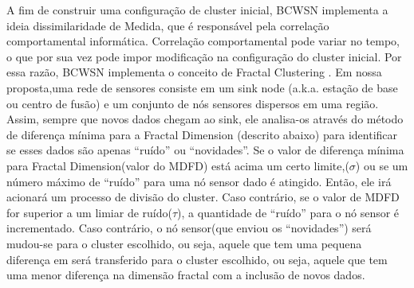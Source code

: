 \documentclass{acm_proc_article-sp}
\begin{document}


A fim de construir uma configuração de cluster inicial, BCWSN implementa
a ideia dissimilaridade de Medida, que é responsável pela correlação
comportamental informática. Correlação comportamental pode variar no tempo,
o que por sua vez pode impor modificação na configuração do cluster inicial.
Por essa razão, BCWSN implementa o conceito de Fractal Clustering
\cite{Barbara2000}. Em nossa proposta,uma rede de sensores consiste
em um sink node (a.k.a. estação de base ou centro de fusão) e um conjunto
de nós sensores dispersos em uma região.
Assim, sempre que novos dados chegam ao sink, ele analisa-os através do método
de diferença mínima para a Fractal Dimension (descrito abaixo) para
identificar se esses dados são apenas ``ruído'' ou ``novidades''. 
Se o valor de diferença mínima para Fractal Dimension(valor do MDFD)
está acima um certo limite,($\sigma$) ou se um número máximo de ``ruído'' 
para uma nó sensor dado é atingido. Então, ele irá acionará um processo de
divisão do cluster. Caso contrário, se o valor de MDFD for superior a um 
limiar de ruído($\tau$), a quantidade de ``ruído'' para o nó sensor é 
incrementado. Caso contrário, o nó sensor(que enviou os ``novidades'')
será mudou-se para o cluster escolhido, ou seja, aquele que tem uma pequena
diferença em será transferido para o cluster escolhido, ou seja, aquele que
tem uma menor diferença na dimensão fractal com a inclusão de novos dados.
\vspace*{-.3cm}
\end{document}
